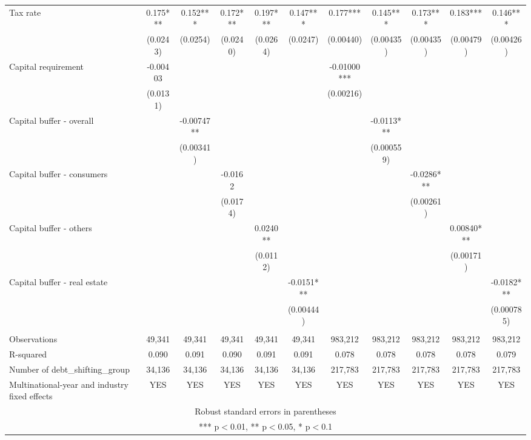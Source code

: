 \begin{tabular}{lcccccccccc}
Tax rate & 0.175*** & 0.152*** & 0.172*** & 0.197*** & 0.147*** & 0.177*** & 0.145*** & 0.173*** & 0.183*** & 0.146*** \\
 & (0.0243) & (0.0254) & (0.0240) & (0.0264) & (0.0247) & (0.00440) & (0.00435) & (0.00435) & (0.00479) & (0.00426) \\
Capital requirement & -0.00403 &  &  &  &  & -0.01000*** &  &  &  &  \\
 & (0.0131) &  &  &  &  & (0.00216) &  &  &  &  \\
Capital buffer - overall &  & -0.00747** &  &  &  &  & -0.0113*** &  &  &  \\
 &  & (0.00341) &  &  &  &  & (0.000559) &  &  &  \\
Capital buffer - consumers &  &  & -0.0162 &  &  &  &  & -0.0286*** &  &  \\
 &  &  & (0.0174) &  &  &  &  & (0.00261) &  &  \\
Capital buffer - others &  &  &  & 0.0240** &  &  &  &  & 0.00840*** &  \\
 &  &  &  & (0.0112) &  &  &  &  & (0.00171) &  \\
Capital buffer - real estate &  &  &  &  & -0.0151*** &  &  &  &  & -0.0182*** \\
 &  &  &  &  & (0.00444) &  &  &  &  & (0.000785) \\
 &  &  &  &  &  &  &  &  &  &  \\
Observations & 49,341 & 49,341 & 49,341 & 49,341 & 49,341 & 983,212 & 983,212 & 983,212 & 983,212 & 983,212 \\
R-squared & 0.090 & 0.091 & 0.090 & 0.091 & 0.091 & 0.078 & 0.078 & 0.078 & 0.078 & 0.079 \\
Number of debt\_shifting\_group & 34,136 & 34,136 & 34,136 & 34,136 & 34,136 & 217,783 & 217,783 & 217,783 & 217,783 & 217,783 \\
 Multinational-year and industry fixed effects & YES & YES & YES & YES & YES & YES & YES & YES & YES & YES \\ \hline
\multicolumn{11}{c}{ Robust standard errors in parentheses} \\
\multicolumn{11}{c}{ *** p$<$0.01, ** p$<$0.05, * p$<$0.1} \\
\end{tabular}
